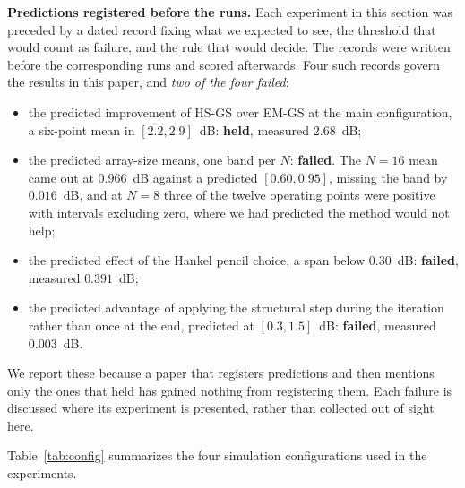 \documentclass[journal]{IEEEtran}
\begin{document}
\textbf{Predictions registered before the runs.} Each experiment in this
section was preceded by a dated record fixing what we expected to see, the threshold
that would count as failure, and the rule that would decide. The records were
written before the corresponding runs and scored afterwards. Four such records
govern the results in this paper, and \emph{two of the four failed}:

\begin{itemize}
\item the predicted improvement of HS-GS over EM-GS at the main configuration,
  a six-point mean in $[2.2,2.9]$~dB: \textbf{held}, measured $2.68$~dB;
\item the predicted array-size means, one band per $N$: \textbf{failed}. The
  $N=16$ mean came out at $0.966$~dB against a predicted $[0.60,0.95]$, missing
  the band by $0.016$~dB, and at $N=8$ three of the twelve operating points
  were positive with intervals excluding zero, where we had predicted the
  method would not help;
\item the predicted effect of the Hankel pencil choice, a span below
  $0.30$~dB: \textbf{failed}, measured $0.391$~dB;
\item the predicted advantage of applying the structural step during the
  iteration rather than once at the end, predicted at $[0.3,1.5]$~dB:
  \textbf{failed}, measured $0.003$~dB.
\end{itemize}

We report these because a paper that registers predictions and then mentions
only the ones that held has gained nothing from registering them. Each failure
is discussed where its experiment is presented, rather than collected out of
sight here.

Table~\ref{tab:config} summarizes the four simulation configurations used in
the experiments.
\end{document}

